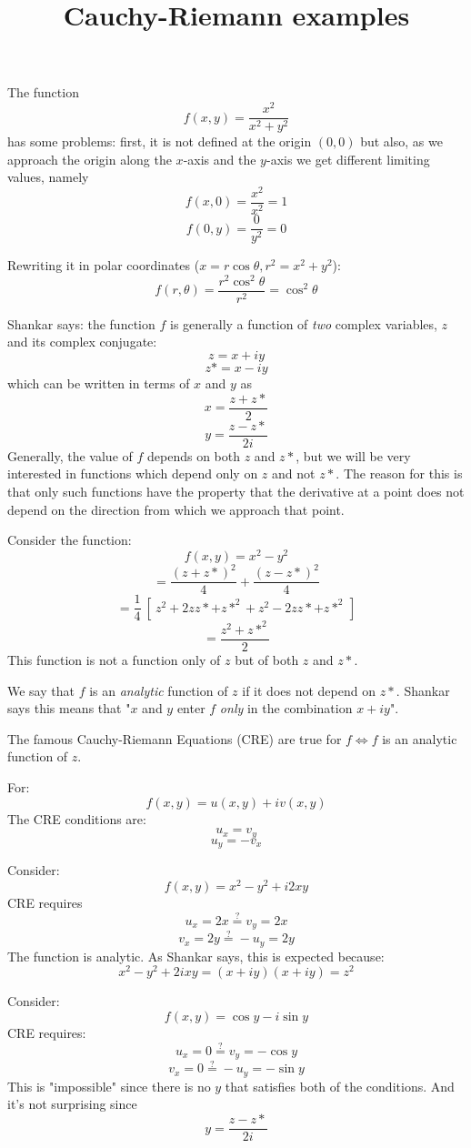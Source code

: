 \documentclass[11pt, oneside]{article}   	%
\title{Cauchy-Riemann examples}
\date{}							%
\begin{document}
\maketitle
\Large
The function
\[ f(x,y) = \frac{x^2}{x^2 + y^2} \]
has some problems:  first, it is not defined at the origin $(0,0)$ but also, as we approach the origin along the $x$-axis and the $y$-axis we get different limiting values, namely
\[ f(x,0) = \frac{x^2}{x^2} = 1 \]
\[ f(0,y) = \frac{0}{y^2} = 0 \]

Rewriting it in polar coordinates ($x = r \cos \theta, r^2 = x^2 + y^2$):
\[ f(r,\theta) = \frac{r^2 \cos^2 \theta}{r^2} = \cos^2 \theta \]

Shankar says:  the function $f$ is generally a function of \emph{two} complex variables, $z$ and its complex conjugate:
\[ z = x + iy \]
\[ z* = x - iy \]
which can be written in terms of $x$ and $y$ as
\[ x = \frac{z + z*}{2} \]
\[ y = \frac{z - z*}{2i} \]
Generally, the value of $f$ depends on both $z$ and $z*$, but we will be very interested in functions which depend only on $z$ and not $z*$.  The reason for this is that only such functions have the property that the derivative at a point does not depend on the direction from which we approach that point.

Consider the function:
\[ f(x,y) = x^2 - y^2 \]
\[ = \frac{(z+z*)^2}{4} + \frac{(z-z*)^2}{4} \]
\[ = \frac{1}{4} \ [ \ z^2 + 2zz* + z*^2 + z^2 - 2zz* + z*^2 \ ] \]
\[ = \frac{z^2 + z*^2}{2} \]
This function is not a function only of $z$ but of both $z$ and $z*$.

We say that $f$ is an \emph{analytic} function of $z$ if it does not depend on $z*$.  Shankar says this means that "$x$ and $y$ enter $f$ \emph{only} in the combination $x + iy$".

The famous Cauchy-Riemann Equations (CRE) are true for $f \iff f$ is an analytic function of $z$.  

For:
\[ f(x,y) = u(x,y) + iv(x,y) \]
The CRE conditions are:
\[ u_x = v_y \]
\[ u_y = -v_x \]

Consider:
\[ f(x,y) = x^2 - y^2 + i2xy \]
CRE requires
\[ u_x = 2x \stackrel{?}{=}  v_y = 2x \]
\[ v_x = 2y \stackrel{?}{=} - u_y = 2y \]
The function is analytic.  As Shankar says, this is expected because:
\[ x^2 - y^2 + 2ixy = (x + iy)(x + iy) = z^2 \]

Consider:
\[ f(x,y) = \cos y - i \sin y \]
CRE requires:
\[ u_x = 0 \stackrel{?}{=} v_y = - \cos y \]
\[ v_x = 0 \stackrel{?}{=}  -u_y = - \sin y \]
This is "impossible" since there is no $y$ that satisfies both of the conditions.  And it's not surprising since
\[ y = \frac{z - z*}{2i} \]
\end{document}
